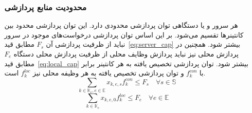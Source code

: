 \subsubsection{محدودیت منابع پردازشی}
هر سرور و یا دستگاهی توان پردازشی محدودی دارد. این توان پردازشی محدود بین کانتینرها تقسیم می‌شود. بر این اساس توان پردازشی درخواست‌های موجود در سرور نباید از ظرفیت پردازشی آن $F_s$ مطابق قید~\eqref{eq:server_cap} بیشتر شود. همچنین در پردازش محلی نیز نباید پردازش وظایف محلی از ظرفیت پردازش محلی دستگاه $F_e$ مطابق قید~\eqref{eq:local_cap} بیشتر شود. توان پردازشی تخصیص یافته به هر کانتینر برابر با $f^{con}_k$ و توان پردازشی تخصیص یافته به هر وظیفه محلی نیز $f^{loc}_k$ است.
\begin{equation} \label{eq:server_cap}
    \sum_{k \in \mathbb{K}_e,e \in \mathbb{E}} x_{k,e,s} f^{con}_k \leq F_s \quad \forall s \in \mathbb{S}
\end{equation}
\begin{equation} \label{eq:local_cap}
    \sum_{k \in \mathbb{K}_e} x_{k,e,0} f^{loc}_k \leq F_e \quad \forall e \in \mathbb{E}
\end{equation}

